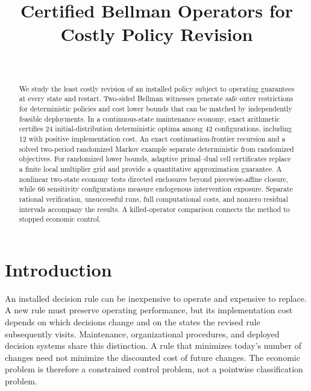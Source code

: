 

\begin{frontmatter}
\title{Certified Bellman Operators for Costly Policy Revision}
\begin{aug}\author[id=au1,addressref={add1}]{~}\address[id=add1]{}\end{aug}
\begin{abstract}
We study the least costly revision of an installed policy subject to operating guarantees at every state and restart. Two-sided Bellman witnesses generate safe outer restrictions for deterministic policies and cost lower bounds that can be matched by independently feasible deployments. In a continuous-state maintenance economy, exact arithmetic certifies 24 initial-distribution deterministic optima among 42 configurations, including 12 with positive implementation cost. An exact continuation-frontier recursion and a solved two-period randomized Markov example separate deterministic from randomized objectives. For randomized lower bounds, adaptive primal--dual cell certificates replace a finite local multiplier grid and provide a quantitative approximation guarantee. A nonlinear two-state economy tests directed enclosures beyond piecewise-affine closure, while 66 sensitivity configurations measure endogenous intervention exposure. Separate rational verification, unsuccessful runs, full computational costs, and nonzero residual intervals accompany the results. A killed-operator comparison connects the method to stopped economic control.
\end{abstract}
\begin{keyword}\end{keyword}
\end{frontmatter}

\section{Introduction}\label{sec:intro}
An installed decision rule can be inexpensive to operate and expensive to replace. A new rule must preserve operating performance, but its implementation cost depends on which decisions change and on the states the revised rule subsequently visits. Maintenance, organizational procedures, and deployed decision systems share this distinction. A rule that minimizes today's number of changes need not minimize the discounted cost of future changes. The economic problem is therefore a constrained control problem, not a pointwise classification problem.

